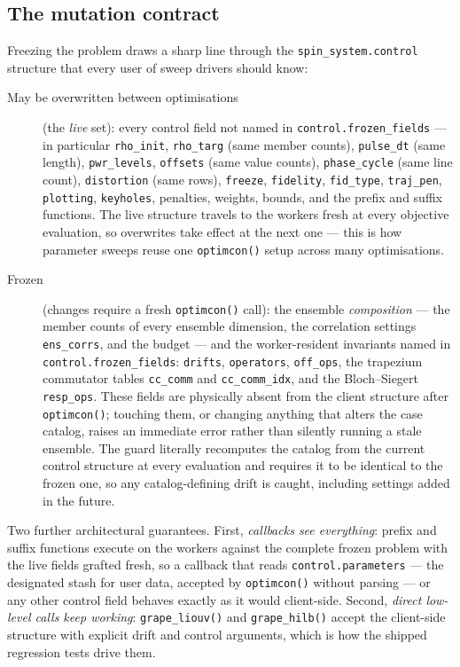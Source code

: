 \documentclass[11pt,a4paper]{article}
\newcommand{\code}[1]{\texttt{#1}}
\begin{document}
\subsection{The mutation contract}
\label{sec:contract}

Freezing the problem draws a sharp line through the
\code{spin\_system.control} structure that every user of sweep drivers
should know:

\begin{description}
\item[May be overwritten between optimisations] (the \emph{live} set):
  every control field not named in \code{control.frozen\_fields} ---
  in particular \code{rho\_init}, \code{rho\_targ} (same member
  counts), \code{pulse\_dt} (same length), \code{pwr\_levels},
  \code{offsets} (same value counts), \code{phase\_cycle} (same line
  count), \code{distortion} (same rows), \code{freeze},
  \code{fidelity}, \code{fid\_type}, \code{traj\_pen}, \code{plotting},
  \code{keyholes}, penalties, weights, bounds, and the prefix and
  suffix functions. The live
  structure travels to the workers fresh at every objective
  evaluation, so overwrites take effect at the next one --- this is
  how parameter sweeps reuse one \code{optimcon()} setup across many
  optimisations.
\item[Frozen] (changes require a fresh \code{optimcon()} call): the
  ensemble \emph{composition} --- the member counts of every ensemble
  dimension, the correlation settings \code{ens\_corrs}, and the budget
  --- and the worker-resident invariants named in
  \code{control.frozen\_fields}: \code{drifts}, \code{operators},
  \code{off\_ops}, the trapezium commutator tables \code{cc\_comm} and
  \code{cc\_comm\_idx}, and the Bloch--Siegert \code{resp\_ops}. These
  fields are physically absent from the
  client structure after \code{optimcon()}; touching them, or changing
  anything that alters the case catalog, raises an immediate error
  rather than silently running a stale ensemble. The guard literally
  recomputes the catalog from the current control structure at every
  evaluation and requires it to be identical to the frozen one, so any
  catalog-defining drift is caught, including settings added in the
  future.
\end{description}

Two further architectural guarantees. First, \emph{callbacks see
everything}: prefix and suffix functions execute on the workers against
the complete frozen problem with the live fields grafted fresh, so a
callback that reads \code{control.parameters} --- the designated stash
for user data, accepted by \code{optimcon()} without parsing --- or any
other control field behaves exactly as it would client-side. Second,
\emph{direct low-level calls keep working}: \code{grape\_liouv()} and
\code{grape\_hilb()} accept the client-side structure with explicit
drift and control arguments, which is how the shipped regression tests
drive them.
\end{document}
